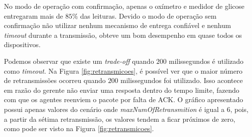 
No modo de operação com confirmação, apenas o oxímetro e medidor de glicose entregaram mais de $85\%$ das leituras. Devido o modo de operação sem confirmação não utilizar nenhum mecanismo de entrega confiável e nenhum \textit{timeout} durante a transmissão, obteve um bom desempenho em quase todos os dispositivos.


Podemos observar que existe um \textit{trade-off} quando $200$ milissegundos é utilizado como \textit{timeout}. Na Figura \ref{fig:retransmicoes}, é possível ver que o maior número de retransmissões ocorreu quando $200$ milissegundos foi utilizado. Isso acontece em razão do gerente não enviar uma resposta dentro do tempo limite, fazendo com que os agentes reenviem o pacote por falta de ACK. O gráfico apresentado possui apenas valores do cenário onde \textit{maxNumOfRetransmition} é igual a $6$, pois, a partir da sétima retransmissão, os valores tendem a ficar próximos de zero, como pode ser visto na Figura \ref{fig:retransmicoes}.

